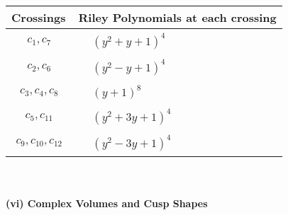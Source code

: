 \documentclass[1p]{elsarticle_modified}
\theoremstyle{definition}
\begin{document}
\begin{tabular}{m{50pt}|m{274pt}}
Crossings & \hspace{64pt}Riley Polynomials at each crossing \\
\hline $$\begin{aligned}c_{1},c_{7}\end{aligned}$$&$\begin{aligned}
&(y^2+y+1)^4
\end{aligned}$\\
\hline $$\begin{aligned}c_{2},c_{6}\end{aligned}$$&$\begin{aligned}
&(y^2- y+1)^4
\end{aligned}$\\
\hline $$\begin{aligned}c_{3},c_{4},c_{8}\end{aligned}$$&$\begin{aligned}
&(y+1)^8
\end{aligned}$\\
\hline $$\begin{aligned}c_{5},c_{11}\end{aligned}$$&$\begin{aligned}
&(y^2+3 y+1)^4
\end{aligned}$\\
\hline $$\begin{aligned}c_{9},c_{10},c_{12}\end{aligned}$$&$\begin{aligned}
&(y^2-3 y+1)^4
\end{aligned}$\\
\hline
\end{tabular}\\~\\
\newpage\flushleft \textbf{(vi) Complex Volumes and Cusp Shapes}
\end{document}
